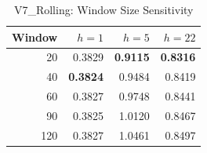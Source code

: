 \begin{table}[htbp]
\centering
\caption{V7\_Rolling: Window Size Sensitivity}
\label{tab:rolling_sensitivity}
\begin{tabular}{rrrr}
\toprule
Window & $h=1$ & $h=5$ & $h=22$ \\
\midrule
20 & 0.3829 & \textbf{0.9115} & \textbf{0.8316} \\
40 & \textbf{0.3824} & 0.9484 & 0.8419 \\
60 & 0.3827 & 0.9748 & 0.8441 \\
90 & 0.3825 & 1.0120 & 0.8467 \\
120 & 0.3827 & 1.0461 & 0.8497 \\
\bottomrule
\end{tabular}
\end{table}